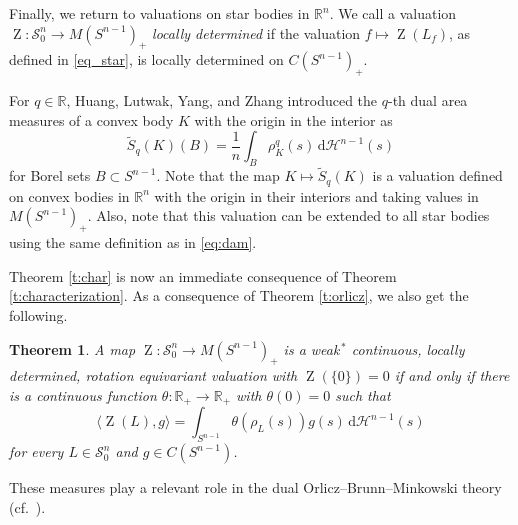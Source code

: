 \documentclass[11pt, a4paper]{amsart}
\newtheorem{theorem}[proposition]{Theorem}
\renewcommand{\d}{\,\mathrm{d}}
\newcommand{\hn}{\mathcal H^{n-1}}
\newcommand{\rp}{\mathbb R_{\scriptscriptstyle +}}
\newcommand{\sn}{{S^{n-1}}}
\renewcommand{\d}{\,\mathrm{d}}
\newcommand{\oZ}{\operatorname{Z}}
\newcommand{\starn}{\mathcal S_{\scriptscriptstyle 0}^n}
\newcommand{\measn}{M(\sn )_{\scriptscriptstyle +}}
\newcommand{\cfn}{C(\sn )_{\scriptscriptstyle +}}
\newcommand{\R}{\mathbb R}
\newcommand{\rn}{\mathbb R^n}
\begin{document}
Finally, we return to valuations on star bodies in $\R^n$. We call a valuation $\oZ\colon \starn\to \measn$ \emph{locally determined} if the valuation $f\mapsto \oZ(L_{f})$, as defined in \eqref{eq_star}, is locally determined on $\cfn$. 

For $q\in\R$, Huang, Lutwak, Yang, and Zhang \cite{HLYZ}  introduced the $q$-th dual area measures of a convex body $K$ with the origin in the interior as 
\begin{equation}\label{eq:dam}
    \tilde S_q(K)(B)= \frac1n \int_B \rho_K^q(s) \d\hn(s) 
\end{equation}
for Borel sets $B\subset \sn$. Note that the map $K \mapsto \tilde S_q(K)$ is a valuation defined on convex bodies in $\rn$ with the origin in their interiors and taking values in $\measn$. Also, note that this valuation can be extended to all star bodies using the same definition as in \eqref{eq:dam}. 

Theorem \ref{t:char} is now an immediate consequence of Theorem \ref{t:characterization}. As a consequence of Theorem \ref{t:orlicz}, we also get the following.

\begin{theorem} 
A map $\oZ\colon \starn\to \measn$ is a weak$^{\,*}\!$ continuous, locally determined, rotation equi\-variant valuation with $\oZ(\{0\})=0$ if and only if there is 
a continuous function $\theta\colon\rp\to\rp$ with $\theta(0)=0$ such that
$$\langle \oZ(L),g\rangle =\int_{\sn} \theta(\rho_L(s))g(s)\d\hn( s)$$
for every $L\in\starn$ and $g\in C(\sn)$.
\end{theorem}

\noindent
These measures play a relevant role in the dual Orlicz--Brunn--Minkowski theory (cf.\ \cite{ZhuZhouXu, GardnerHugWeilYe}).
\end{document}
